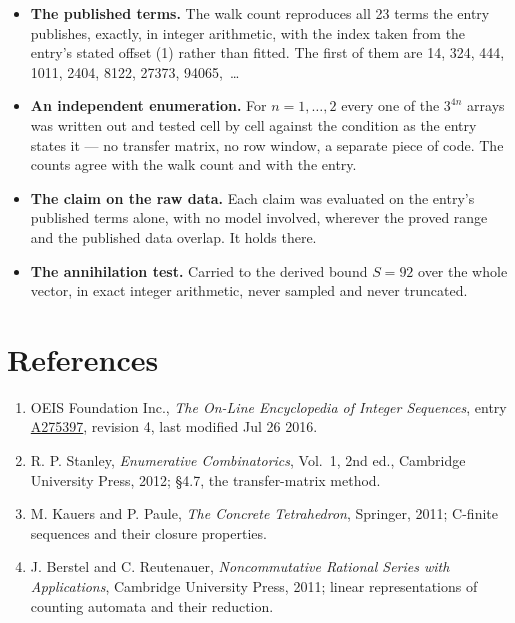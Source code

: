 \documentclass[11pt]{article}
\theoremstyle{definition}
\begin{document}
\begin{itemize}

\item {\bfseries The published terms.} The walk count reproduces all 23 terms the entry publishes, exactly, in integer arithmetic, with the index taken from the entry's stated offset (1) rather than fitted. The first of them are 14, 324, 444, 1011, 2404, 8122, 27373, 94065,~\dots

\item {\bfseries An independent enumeration.} For $n = 1,\dots,2$ every one of the $3^{4n}$ arrays was written out and tested cell by cell against the condition as the entry states it --- no transfer matrix, no row window, a separate piece of code. The counts agree with the walk count and with the entry.

\item {\bfseries The claim on the raw data.} Each claim was evaluated on the entry's published terms alone, with no model involved, wherever the proved range and the published data overlap. It holds there.

\item {\bfseries The annihilation test.} Carried to the derived bound $S = 92$ over the whole vector, in exact integer arithmetic, never sampled and never truncated.

\end{itemize}

\section{References}

\begin{enumerate}

\item OEIS Foundation Inc., \emph{The On-Line Encyclopedia of Integer Sequences}, entry \href{https://oeis.org/A275397}{A275397}, revision 4, last modified Jul 26 2016.

\item R. P. Stanley, \emph{Enumerative Combinatorics}, Vol.~1, 2nd ed., Cambridge University Press, 2012; \S4.7, the transfer-matrix method.

\item M. Kauers and P. Paule, \emph{The Concrete Tetrahedron}, Springer, 2011; C-finite sequences and their closure properties.

\item J. Berstel and C. Reutenauer, \emph{Noncommutative Rational Series with Applications}, Cambridge University Press, 2011; linear representations of counting automata and their reduction.

\end{enumerate}
\end{document}
